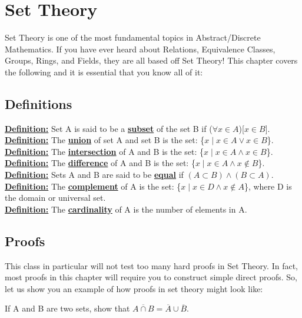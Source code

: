 \chapter{Set Theory}
Set Theory is one of the most fundamental topics in Abstract/Discrete
Mathematics. If you have ever heard about Relations, Equivalence Classes,
Groups, Rings, and Fields, they are all based off Set Theory! This chapter
covers the following and it is essential that you know all of it:

\section{Definitions}
\underline{\textbf{Definition:}} Set A is said to be a
\underline{\textbf{subset}} of the set B if ($\forall x \in A$)[$x \in B$]. \\
\underline{\textbf{Definition:}} The \underline{\textbf{union}} of set A and
set B is the set: \{$x \mid x \in A \vee x \in B$\}. \\
\underline{\textbf{Definition:}} The \underline{\textbf{intersection}} of A and
B is the set: \{$x \mid x \in A \wedge x \in B$\}.\\
\underline{\textbf{Definition:}} The \underline{\textbf{difference}} of A and B
is the set: \{$x \mid x \in A \wedge x \not\in B$\}. \\
\underline{\textbf{Definition:}} Sets A and B are said to be
\underline{\textbf{equal}} if $(A \subset B) \wedge (B \subset A)$. \\
\underline{\textbf{Definition:}} The \underline{\textbf{complement}} of A is
the set: \{$x \mid x \in D \wedge x \not\in A$\}, where D is the domain or
universal set. \\
\underline{\textbf{Definition:}} The \underline{\textbf{cardinality}} of A is
the number of elements in A.

\section{Proofs}
This class in particular will not test too many hard proofs in Set Theory. In
fact, most proofs in this chapter will require you to construct simple direct
proofs. So, let us show you an example of how proofs in set theory might look
like: \\
\begin{center}
    If A and B are two sets, show that $\overline{A \cap B} = \overline{A} \cup
    \overline{B}$.
\end{center}

